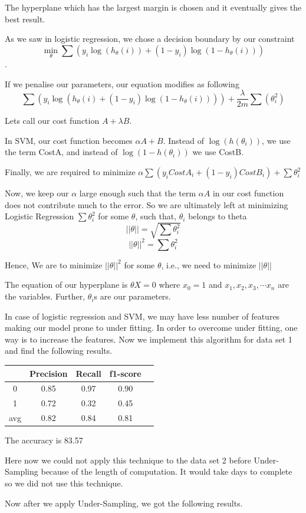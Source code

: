The hyperplane which has the largest margin is chosen and it eventually gives the best result.

As we saw in logistic regression, we chose a decision boundary by our constraint $$\displaystyle \min_\theta  \sum (y_i\log (h_\theta (i))+(1-y_i)\log(1-h_\theta (i))) $$.

If we penalise our parameters, our equation modifies as following
$$\sum (y_i\log(h_\theta (i)+(1-y_i)\log(1-h_\theta (i))))+ \frac{\lambda}{2m}\sum (\theta_i^2)$$

Lets call our cost function $A+\lambda B$.

In SVM, our cost function becomes $\alpha A+B$.
Instead of $\log(h(\theta_i))$, we use the term CostA, and instead of $\log(1-h(\theta_i))$ we use CostB.

Finally, we are required to minimize 
$\alpha\sum {(y_i CostA_i+(1-y_i)CostB_i)}+\sum \theta_i^2$

Now, we keep our $\alpha$ large enough such that the term $\alpha A$ in our cost function does not contribute much to the error.
So we are ultimately left at minimizing Logistic Regression
$\sum \theta_i^2$ for some $\theta$, such that, $\theta_i$ belongs to theta
$$
||\theta||=\sqrt{\sum {\theta_i^2}}
$$
$$
||\theta||^2=\sum{\theta_i^2}
$$

Hence,
We are to minimize $||\theta||^2$ for some $\theta$, i.e., we need to minimize $||\theta||$

The equation of our hyperplane is $\theta X=0$ where $x_0=1$ and $x_1,x_2,x_3,\cdots x_n$ are the variables. Further, $\theta_i$s are our parameters.

In case of logistic regression and SVM, we may have less number of features making our model prone to under fitting. In order to overcome under fitting, one way is to increase the features.
Now we implement this algorithm for data set 1 and find the following results.
\begin{center}
\begin{tabular}{| c | c | c | c | c |}
\hline
    & Precision & Recall & f1-score\\
\hline
0 & 0.85 & 0.97 & 0.90 \\
\hline
1 & 0.72 & 0.32 & 0.45 \\
\hline
avg & 0.82 & 0.84 & 0.81 \\
\hline
\end{tabular}
\end{center} 
\begin{center}
The accuracy is 83.57%
\end{center}
\par Here now we could not apply this technique to the data set 2 before Under-Sampling because of the length of computation. It would take days to complete so we did not use this technique.
\par Now after we apply Under-Sampling, we got the following results.

